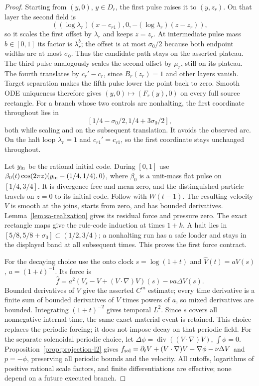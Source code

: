 \begin{proof}
Starting from $(y,0)$, $y\in D_r$, the first pulse raises it to
$(y,z_r)$.  On that layer the second field is
\[
 ((\log\lambda_r)(x-c_{r1}),0,-(\log\lambda_r)(z-z_r)),
\]
so it scales the first offset by $\lambda_r$ and keeps $z=z_r$.
At intermediate pulse mass $b\in[0,1]$ its factor is $\lambda_r^b$;
the offset is at most $\sigma_0/2$ because both endpoint widths are at
most $\sigma_0$.  Thus the candidate path stays on the asserted plateau.
The third pulse analogously scales the second offset by $\mu_r$, still
on its plateau.  The fourth translates by $c_r'-c_r$, since
$B_r(z_r)=1$ and other layers vanish.  Target separation makes the fifth
pulse lower the point back to zero.  Smooth ODE uniqueness therefore gives
$(y,0)\mapsto(F_r(y),0)$ on every full source rectangle.
For a branch whose two controls are nonhalting, the first coordinate
throughout lies in
\[
 [1/4-\sigma_0/2,1/4+3\sigma_0/2],
\]
both while scaling and on the subsequent translation.  It avoids the
observed arc.  On the halt loop $\lambda_r=1$ and $c_{r1}'=c_{r1}$,
so the first coordinate stays unchanged throughout.

Let $y_{\rm in}$ be the rational initial code.  During $[0,1]$ use
$\beta_0(t)\cos(2\pi z)(y_{\rm in}-(1/4,1/4),0)$, where
$\beta_0$ is a unit-mass flat pulse on $[1/4,3/4]$.  It is divergence
free and mean zero, and the distinguished particle travels on $z=0$
to its initial code.  Follow with $W(t-1)$.  The resulting velocity $V$
is smooth at the joins, starts from zero, and has bounded derivatives.
Lemma~\ref{lem:sa-realization} gives its residual force and pressure zero.
The exact rectangle maps give the rule-code induction at times $1+k$.
A halt lies in $[5/8,5/8+\sigma_0]\subset(1/2,3/4)$; a nonhalting run
has a safe loader and stays in the displayed band at all subsequent
times.  This proves the first force contract.

For the decaying choice use the onto clock $s=\log(1+t)$ and
$\widehat V(t)=aV(s)$, $a=(1+t)^{-1}$.  Its force is
\[
 \widehat f=a^2(V_s-V+(V\cdot\nabla)V)(s)-\nu a\Delta V(s).
\]
Bounded derivatives of $V$ give the asserted $C^m$ estimate; every time
derivative is a finite sum of bounded derivatives of $V$ times powers
of $a$, so mixed derivatives are bounded.  Integrating $(1+t)^{-2}$
gives temporal $L^2$.  Since $s$ covers all nonnegative internal time,
the same exact material event is retained.  This choice replaces the
periodic forcing; it does not impose decay on that periodic field.
For the separate solenoidal periodic choice, let
$\Delta\phi=\operatorname{div}((V\cdot\nabla)V)$, $\int\phi=0$.
Proposition~\ref{prop:projection-l2} gives
$f_{\rm sol}=\partial_tV+(V\cdot\nabla)V-\nabla\phi-\nu\Delta V$
and $p=-\phi$, preserving all periodic bounds and the velocity.
All cutoffs, logarithms of positive rational scale factors, and finite
differentiations are effective; none depend on a future executed branch.
\end{proof}
